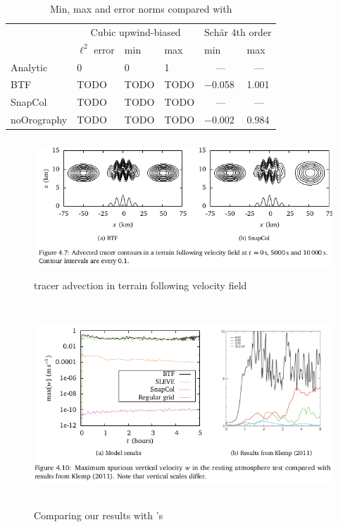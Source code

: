\documentclass[a4paper]{article}
\begin{document}
\begin{table}
\centering
\begin{tabular}{ l l l l l l }
\toprule
& \multicolumn{3}{c}{Cubic upwind-biased} & \multicolumn{2}{c}{Sch\"ar 4th order} \\
& $\ell^2$ error & min & max & min & max \\
\midrule
Analytic  & 0 & 0 & 1 & \multicolumn{1}{c}{---} & \multicolumn{1}{c}{---} \\
BTF 	  & TODO & TODO & TODO & \num{-0.058} & \num{1.001} \\
SnapCol   & TODO & TODO & TODO & \multicolumn{1}{c}{---} & \multicolumn{1}{c}{---} \\
noOrography & TODO & TODO & TODO & \num{-0.002} & \num{0.984} \\
\bottomrule
\end{tabular}
%
\caption{Min, max and error norms compared with \textcite{schaer2002}}
\label{tab:advection-stats}
\end{table}

\begin{figure}
	\includegraphics[height=2in]{wobblyTracerAdvection.png}
%
	\caption{tracer advection in terrain following velocity field}
	\label{fig:wobblyTracerAdvection}
\end{figure}

\begin{figure}
	\includegraphics[height=3in]{resting-atmosphere-w.png}
%
	\caption{Comparing our results with \textcite{klemp2011}'s}
	\label{fig:resting}
\end{figure}
\end{document}
